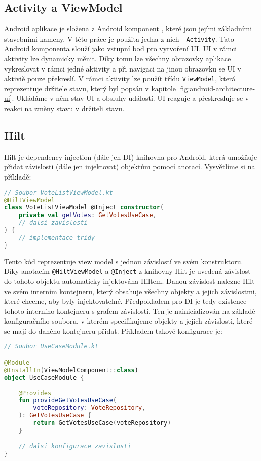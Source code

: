 \subsection *{Activity a ViewModel}
Android aplikace je složena z Android komponent \cite{android-components}, které jsou jejími základními stavebními kameny. V této práce je použita jedna z nich - \lstinline|Activity|. Tato Android komponenta slouží jako vstupní bod pro vytvoření UI. UI v rámci aktivity lze dynamicky měnit. Díky tomu lze všechny obrazovky aplikace vykreslovat v rámci jedné aktivity a při navigaci na jinou obrazovku se UI v aktiviě pouze překreslí. V rámci aktivity lze použít třídu \lstinline|ViewModel|, která reprezentuje držitele stavu, který byl popsán v kapitole \ref{fig:android-architecture-ui}. Ukládáme v něm stav UI a obsluhy událostí. UI reaguje a přeskresluje se v reakci na změny stavu v držiteli stavu. 

\subsection *{Hilt}
Hilt je dependency injection (dále jen DI) knihovna pro Android, která umožňuje přidat závislosti (dále jen injektovat) objektům pomocí anotací. Vysvětlíme si na příkladě:

\newpage

\begin{lstlisting}[caption={Příklad použití DI pomocí knihovny Hilt}, label={lst:hilt-di}, tabsize=2, language=Kotlin]
// Soubor VoteListViewModel.kt
@HiltViewModel
class VoteListViewModel @Inject constructor(
	private val getVotes: GetVotesUseCase,
	// dalsi zavislosti
) {	
	// implementace tridy
}
\end{lstlisting}

\noindent Tento kód reprezentuje view model s jednou závislostí ve svém konstruktoru. Díky anotacím  \lstinline|@HiltViewModel| a \lstinline|@Inject| z knihovny Hilt je uvedená závislost do tohoto objektu automaticky injektována Hiltem. Danou závislost nalezne Hilt ve svém interním kontejneru, který obsahuje všechny objekty a jejich závislostmi, které chceme, aby byly injektovatelné. Předpokladem pro DI je tedy existence tohoto interního kontejneru s grafem závislostí. Ten je nainicializován na základě konfiguračního souboru, v kterém specifikujeme objekty a jejich závislosti, které se mají do daného kontejneru přidat. Příkladem takové konfigurace je:

\begin{lstlisting}[caption={Ukázka konfigurace DI pro Hilt}, label={lst:hilt-config}, tabsize=2, language=Kotlin]
// Soubor UseCaseModule.kt

@Module
@InstallIn(ViewModelComponent::class)
object UseCaseModule {	
	
	@Provides
	fun provideGetVotesUseCase(
		voteRepository: VoteRepository,
	): GetVotesUseCase {
		return GetVotesUseCase(voteRepository)
	}

	// dalsi konfigurace zavislosti
}
\end{lstlisting}

